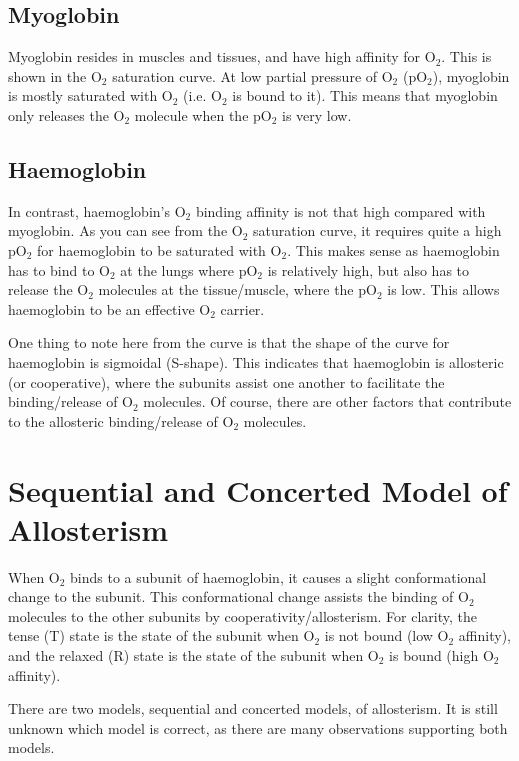 \subsection{Myoglobin}

Myoglobin resides in muscles and tissues, and have high affinity for O$_2$.
This is shown in the O$_2$ saturation curve.
At low partial pressure of O$_2$ (pO$_2$), myoglobin is mostly saturated with O$_2$ (i.e. O$_2$ is bound to it).
This means that myoglobin only releases the O$_2$ molecule when the pO$_2$ is very low.

\subsection{Haemoglobin}

In contrast, haemoglobin's O$_2$ binding affinity is not that high compared with myoglobin.
As you can see from the O$_2$ saturation curve, it requires quite a high pO$_2$ for haemoglobin to be saturated with O$_2$.
This makes sense as haemoglobin has to bind to O$_2$ at the lungs where pO$_2$ is relatively high, but also has to release the O$_2$ molecules at the tissue/muscle, where the pO$_2$ is low.
This allows haemoglobin to be an effective O$_2$ carrier.

One thing to note here from the curve is that the shape of the curve for haemoglobin is sigmoidal (S-shape).
This indicates that haemoglobin is allosteric (or cooperative), where the subunits assist one another to facilitate the binding/release of O$_2$ molecules.
Of course, there are other factors that contribute to the allosteric binding/release of O$_2$ molecules.

\section{Sequential and Concerted Model of \-Allosterism}

When O$_2$ binds to a subunit of haemoglobin, it causes a slight conformational change to the subunit.
This conformational change assists the binding of O$_2$ molecules to the other subunits by cooperativity/allosterism.
For clarity, the tense (T) state is the state of the subunit when O$_2$ is not bound (low O$_2$ affinity), and the relaxed (R) state is the state of the subunit when O$_2$ is bound (high O$_2$ affinity).

There are two models, sequential and concerted models, of allosterism.
It is still unknown which model is correct, as there are many observations supporting both models.

